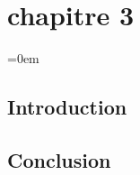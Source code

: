 \chapter{chapitre 3} 
\begingroup
\parindent=0em
\localtableofcontents 
\endgroup
\newpage



\section{Introduction}
\section{Conclusion}
